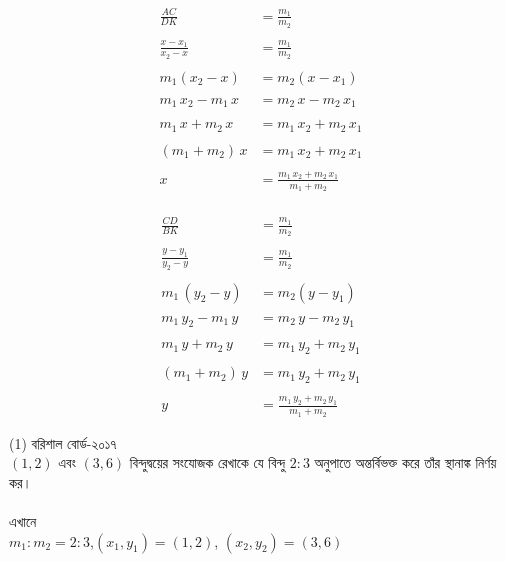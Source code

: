\documentclass{article}
\begin{document}
 \begin{multicols}{2}
 	\begin{align*}
 	\frac{AC}{DK}&=	\frac{m_1}{m_2}\\
 	\\
 	\frac{x-x_1}{x_2-x}&=\frac{m_1}{m_2}\\
 	\\
 	m_1(x_2-x)&=m_2(x-x_1)\\
 	\\
 	m_1\,x_2-m_1\,x&=m_2\,x-m_2\,x_1\\
 	\\
 	m_1\,x+m_2\,x&=m_1\,x_2+m_2\,x_1\\
 	\\
 	(m_1+m_2)\,x&=m_1\,x_2+m_2\,x_1\\
 	\\
 	x&=\frac{m_1\,x_2+m_2\,x_1}{m_1+m_2}
 \end{align*}
 \\
 \begin{align*}
 	\frac{CD}{BK}&=\frac{m_1}{m_2}\\
 	\\
 	\frac{y-y_1}{y_2-y}&=\frac{m_1}{m_2}\\
 	\\
 	m_1\,(y_2-y)&=m_2(y-y_1)\\
 	\\
 	m_1\,y_2-m_1\,y&=m_2\,y-m_2\,y_1\\
 	\\
 	m_1\,y+m_2\,y&=m_1\,y_2+m_2\,y_1\\
 	\\
 	(m_1+m_2)\,y&=m_1\,y_2+m_2\,y_1\\
 	\\
 	y&=\frac{m_1\,y_2+m_2\,y_1}{m_1+m_2}
 \end{align*}
 \end{multicols}
	(1) বরিশাল বোর্ড-২০১৭\\
$(1,2)$ এবং  $(3,6)$ বিন্দুদ্বয়ের সংযোজক রেখাকে যে বিন্দু $2:3$ অনুপাতে অন্তর্বিভক্ত করে তাঁর স্থানাঙ্ক নির্ণয় কর।  \\
\\
এখানে\\ 
$m_1:m_2=2:3$,\qquad $(x_1,y_1)=(1,2)$, \qquad $(x_2,y_2)=(3,6)$\\
\end{document}
